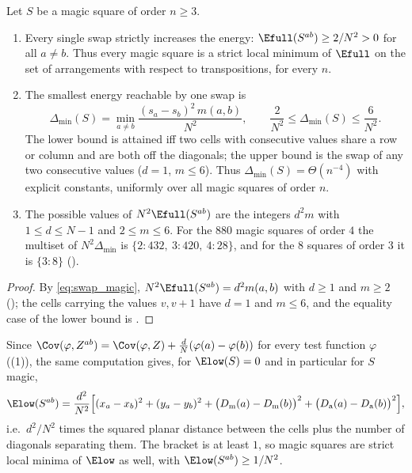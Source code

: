 \begin{corollary}
\label{cor:local_min}
Let $S$ be a magic square of order $n\ge3$.
\begin{enumerate}
\item Every single swap strictly increases the energy: $\Efull(S^{ab})\ge 2/N^{2}>0$ for all $a\ne b$.
Thus every magic square is a strict local minimum of $\Efull$ on the set of arrangements with respect to transpositions, for every $n$.
\item The smallest energy reachable by one swap is
\[
\Delta_{\min}(S)=\min_{a\ne b}\frac{(s_a-s_b)^{2}\,m(a,b)}{N^{2}},\qquad
\frac{2}{N^{2}}\le\Delta_{\min}(S)\le\frac{6}{N^{2}} .
\]
The lower bound is attained iff two cells with consecutive values share a row or column and are both off the diagonals;
the upper bound is the swap of any two consecutive values ($d=1$, $m\le6$).  Thus $\Delta_{\min}(S)=\Theta(n^{-4})$ with
explicit constants, uniformly over all magic squares of order $n$.
\item The possible values of $N^{2}\Efull(S^{ab})$ are the integers $d^{2}m$ with $1\le d\le N-1$ and $2\le m\le6$.
For the $880$ magic squares of order $4$ the multiset of $N^{2}\Delta_{\min}$ is $\{2:432,\ 3:420,\ 4:28\}$, and for the
$8$ squares of order $3$ it is $\{3:8\}$ ().
\end{enumerate}
\end{corollary}

\begin{proof}
By \eqref{eq:swap_magic}, $N^{2}\Efull(S^{ab})=d^{2}m(a,b)$ with $d\ge1$ and $m\ge2$ (); the cells
carrying the values $v,v+1$ have $d=1$ and $m\le6$, and the equality case of the lower bound is .
\end{proof}

\begin{remark}
\label{rem:swap_low}
Since $\Cov(\varphi,Z^{ab})=\Cov(\varphi,Z)+\frac dN(\varphi(a)-\varphi(b))$ for every test function $\varphi$
((1)), the same computation gives, for $\Elow(S)=0$ and in particular for $S$ magic,
\[
\Elow(S^{ab})=\frac{d^{2}}{N^{2}}\Bigl[(x_a-x_b)^{2}+(y_a-y_b)^{2}+\bigl(D_{\mathrm m}(a)-D_{\mathrm m}(b)\bigr)^{2}+\bigl(D_{\mathrm a}(a)-D_{\mathrm a}(b)\bigr)^{2}\Bigr],
\]
i.e.\ $d^{2}/N^{2}$ times the squared planar distance between the cells plus the number of diagonals separating them.
The bracket is at least $1$, so magic squares are strict local minima of $\Elow$ as well, with $\Elow(S^{ab})\ge1/N^{2}$.
\end{remark}

